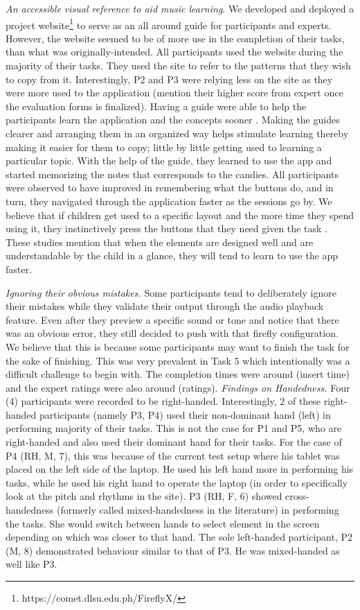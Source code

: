 \textit{An accessible visual reference to aid music learning}. We developed and deployed a project website\footnote{https://comet.dlsu.edu.ph/FireflyX/} to serve as an all around guide for participants and experts. However, the website seemed to be of more use in the completion of their tasks, than what was originally-intended. All participants used the website during the majority of their tasks. They used the site to refer to the patterns that they wish to copy from it.  Interestingly, P2 and P3 were relying less on the site as they were more used to the application (mention their higher score from expert once the evaluation forms is finalized). Having a guide were able to help the participants learn the application and the concepts sooner \cite{pashler2007organizing}. Making the guides clearer and arranging them in an organized way helps stimulate learning thereby making it easier for them to copy; little by little getting used to learning a particular topic. With the help of the guide, they learned to use the app and started memorizing the notes that corresponds to the candies. All participants were observed to have improved in remembering what the buttons do, and in turn, they navigated through the application faster as the sessions go by. We believe that if children get used to a specific layout and the more time they spend using it, they instinctively press the buttons that they need given the task \cite{wiedenbeck1999use, ibharim2014ibuat}. These studies mention that when the elements are designed well and are understandable by the child in a glance, they will tend to learn to use the app faster.

\textit{Ignoring their obvious mistakes.} Some participants tend to deliberately ignore their mistakes while they validate their output through the audio playback feature. Even after they preview a specific sound or tone and notice that there was an obvious error, they still decided to push with that firefly configuration. We believe that this is because some participants may want to finish the task for the sake of finishing. This was very prevalent in Task 5 which intentionally was a difficult challenge to begin with. The completion times were around (insert time) and the expert ratings were also around (ratings). 
\textit{Findings on Handedness.} Four (4) participants were recorded to be right-handed. Interestingly, 2 of these right-handed participants (namely P3, P4) used their non-dominant hand (left) in performing majority of their tasks. This is not the case for P1 and P5, who are right-handed and also used their dominant hand for their tasks. For the case of P4 (RH, M, 7), this was because of the current test setup where his tablet was placed on the left side of the laptop. He used his left hand more in performing his tasks, while he used his right hand to operate the laptop (in order to specifically look at the pitch and rhythms in the site). P3 (RH, F, 6) showed cross-handedness (formerly called mixed-handedness in the literature) in performing the tasks. She would switch between hands to select element in the screen depending on which was closer to that hand. The sole left-handed participant, P2 (M, 8) demonstrated behaviour similar to that of P3. He was mixed-handed as well like P3. 

